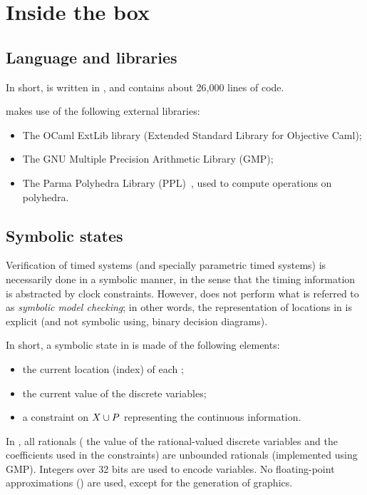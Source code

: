 \chapter{Inside the box}


\section{Language and libraries}

In short, \imitator{} is written in \ocaml{}, and contains about 26,000 lines of code.

\imitator{} makes use of the following external libraries:

\begin{itemize}
	\item The OCaml ExtLib library (Extended Standard Library for Objective Caml);
	\item The GNU Multiple Precision Arithmetic Library (GMP);
	\item The Parma Polyhedra Library (PPL)~\cite{BHZ08}, used to compute operations on polyhedra.
\end{itemize}


\section{Symbolic states}

Verification of timed systems (and specially parametric timed systems) is necessarily done in a symbolic manner, in the sense that the timing information is abstracted by clock constraints.
However, \imitator{} does not perform what is referred to as \emph{symbolic model checking}; in other words, the representation of locations in \imitator{} is explicit (and not symbolic using, \eg{} binary decision diagrams).


In short, a symbolic state in \imitator{} is made of the following elements:
\begin{itemize}
	\item the current location (index) of each \IPTA{};
	\item the current value of the discrete variables;
	\item a constraint on $X \cup P$ representing the continuous information.
\end{itemize}
In \imitator{}, all rationals (\ie{} the value of the rational-valued discrete variables and the coefficients used in the constraints) are unbounded rationals (implemented using GMP).
Integers over 32 bits are used to encode  variables.
No floating-point approximations () are used, except for the generation of graphics.


